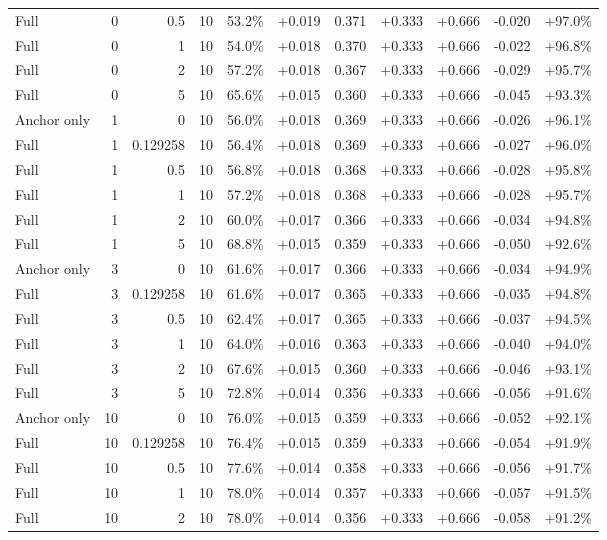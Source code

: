 \begin{table}[htbp]
\begin{tabular}{lrrrccccccc}
Full & 0 & 0.5 & 10 & 53.2\% & +0.019 & 0.371 & +0.333 & +0.666 & -0.020 & +97.0\% \\
Full & 0 & 1 & 10 & 54.0\% & +0.018 & 0.370 & +0.333 & +0.666 & -0.022 & +96.8\% \\
Full & 0 & 2 & 10 & 57.2\% & +0.018 & 0.367 & +0.333 & +0.666 & -0.029 & +95.7\% \\
Full & 0 & 5 & 10 & 65.6\% & +0.015 & 0.360 & +0.333 & +0.666 & -0.045 & +93.3\% \\
Anchor only & 1 & 0 & 10 & 56.0\% & +0.018 & 0.369 & +0.333 & +0.666 & -0.026 & +96.1\% \\
Full & 1 & 0.129258 & 10 & 56.4\% & +0.018 & 0.369 & +0.333 & +0.666 & -0.027 & +96.0\% \\
Full & 1 & 0.5 & 10 & 56.8\% & +0.018 & 0.368 & +0.333 & +0.666 & -0.028 & +95.8\% \\
Full & 1 & 1 & 10 & 57.2\% & +0.018 & 0.368 & +0.333 & +0.666 & -0.028 & +95.7\% \\
Full & 1 & 2 & 10 & 60.0\% & +0.017 & 0.366 & +0.333 & +0.666 & -0.034 & +94.8\% \\
Full & 1 & 5 & 10 & 68.8\% & +0.015 & 0.359 & +0.333 & +0.666 & -0.050 & +92.6\% \\
Anchor only & 3 & 0 & 10 & 61.6\% & +0.017 & 0.366 & +0.333 & +0.666 & -0.034 & +94.9\% \\
Full & 3 & 0.129258 & 10 & 61.6\% & +0.017 & 0.365 & +0.333 & +0.666 & -0.035 & +94.8\% \\
Full & 3 & 0.5 & 10 & 62.4\% & +0.017 & 0.365 & +0.333 & +0.666 & -0.037 & +94.5\% \\
Full & 3 & 1 & 10 & 64.0\% & +0.016 & 0.363 & +0.333 & +0.666 & -0.040 & +94.0\% \\
Full & 3 & 2 & 10 & 67.6\% & +0.015 & 0.360 & +0.333 & +0.666 & -0.046 & +93.1\% \\
Full & 3 & 5 & 10 & 72.8\% & +0.014 & 0.356 & +0.333 & +0.666 & -0.056 & +91.6\% \\
Anchor only & 10 & 0 & 10 & 76.0\% & +0.015 & 0.359 & +0.333 & +0.666 & -0.052 & +92.1\% \\
Full & 10 & 0.129258 & 10 & 76.4\% & +0.015 & 0.359 & +0.333 & +0.666 & -0.054 & +91.9\% \\
Full & 10 & 0.5 & 10 & 77.6\% & +0.014 & 0.358 & +0.333 & +0.666 & -0.056 & +91.7\% \\
Full & 10 & 1 & 10 & 78.0\% & +0.014 & 0.357 & +0.333 & +0.666 & -0.057 & +91.5\% \\
Full & 10 & 2 & 10 & 78.0\% & +0.014 & 0.356 & +0.333 & +0.666 & -0.058 & +91.2\% \\

\end{tabular}
\end{table}
